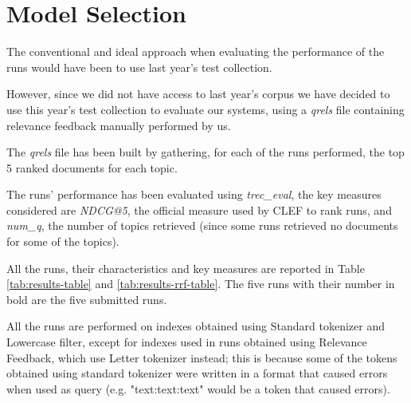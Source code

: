 \section{Model Selection}
\label{sec:results}

The conventional and ideal approach when evaluating the performance of the runs would have been to use last year's test collection. \citep{bondarenko:2021d}

However, since we did not have access to last year's corpus we have decided to use this year's test collection to evaluate our systems, using a \textit{qrels} file containing relevance feedback manually performed by us.

The \textit{qrels} file has been built by gathering, for each of the runs performed, the top 5 ranked documents for each topic.

The runs' performance has been evaluated using \textit{trec\_eval}, the key measures considered are \textit{NDCG@5}, the official measure used by CLEF to rank runs, and \textit{num\_q}, the number of topics retrieved (since some runs retrieved no documents for some of the topics).

All the runs, their characteristics and key measures are reported in Table \ref{tab:results-table} and \ref{tab:results-rrf-table}. The five runs with their number in bold are the five submitted runs.

All the runs are performed on indexes obtained using Standard tokenizer and Lowercase filter, except for indexes used in runs obtained using Relevance Feedback, which use Letter tokenizer instead; this is because some of the tokens obtained using standard tokenizer were written in a format that caused errors when used as query (e.g. "text:text:text" would be a token that caused errors).

